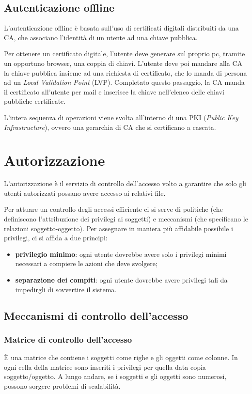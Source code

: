\documentclass[a4paper, 11pt]{article}
\begin{document}
\begin{multicols}{2}
	\subsection{Autenticazione offline}
	L'autenticazione offline è basata sull'uso di certificati digitali distribuiti da una CA, che associano l'identità di un utente ad una chiave pubblica.
	
	Per ottenere un certificato digitale, l'utente deve generare sul proprio pc, tramite un opportuno browser, una coppia di chiavi. L'utente deve poi mandare alla CA la chiave pubblica insieme ad una richiesta di certificato, che lo manda di persona ad un \textit{Local Validation Point} (LVP). Completato questo passaggio, la CA manda il certificato all'utente per mail e inserisce la chiave nell'elenco delle chiavi pubbliche certificate.
	
	L'intera sequenza di operazioni viene svolta all'interno di una PKI (\textit{Public Key Infrastructure}), ovvero una gerarchia di CA che si certificano a cascata.
	
	\section{Autorizzazione}
	L'autorizzazione è il servizio di controllo dell'accesso volto a garantire che solo gli utenti autorizzati possano avere accesso ai relativi file.
	
	Per attuare un controllo degli accessi efficiente ci si serve di politiche (che definiscono l'attribuzione dei privilegi ai soggetti) e meccanismi (che specificano le relazioni soggetto-oggetto). Per assegnare in maniera più affidabile possibile i privilegi, ci si affida a due principi:
	\begin{itemize}
		\item \textbf{privilegio minimo}: ogni utente dovrebbe avere solo i privilegi minimi necessari a compiere le azioni che deve svolgere;
		\item \textbf{separazione dei compiti}: ogni utente dovrebbe avere privilegi tali da impedirgli di sovvertire il sistema.
	\end{itemize}
\subsection{Meccanismi di controllo dell'accesso}
\subsubsection{Matrice di controllo dell'accesso}
	È una matrice che contiene i soggetti come righe e gli oggetti come colonne. In ogni cella della matrice sono inseriti i privilegi per quella data copia soggetto/oggetto. A lungo andare, se i soggetti e gli oggetti sono numerosi, possono sorgere problemi di scalabilità.
	

\end{multicols}
\end{document}

